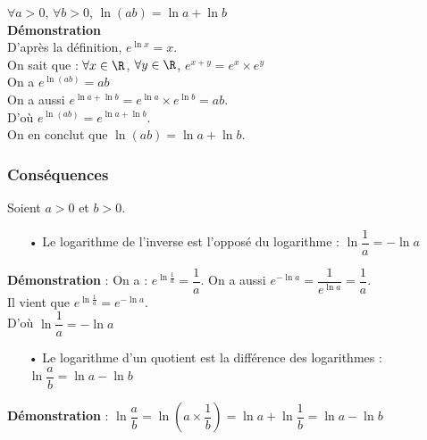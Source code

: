 $\forall a >0$, $\forall b > 0$, $\ln \left(ab\right) = \ln a + \ln b$ \\

\textbf{Démonstration} \\

D'après la définition, $e^{\ln x} = x$. \\

On sait que : $\forall x \in \R$, $\forall y \in \R$, $e^{x+y} = e^x \times e^y$ \\

On a $e^{\ln\left(ab\right)} = ab$ \\

On a aussi $e^{\ln a + \ln b} = e^{\ln a} \times e^{\ln b} = ab$. \\

D'où $e^{\ln\left(ab\right)} = e^{\ln a + \ln b}$. \\

On en conclut que $\ln\left(ab\right) = \ln a + \ln b$. 

\newpage

\subsubsection{Conséquences}

Soient $a>0$ et $b>0$. \\

\begin{itemize}
\item[•] Le logarithme de l'inverse est l'opposé du logarithme : $\ln \dfrac{1}{a} = -\ln a$ \\
\end{itemize}

\textbf{Démonstration} : On a : $e^{\ln \frac{1}{a}} = \dfrac{1}{a}$. On a aussi $e^{-\ln a} = \dfrac{1}{e^{\ln a}} = \dfrac{1}{a}$. \\

Il vient que $e^{\ln \frac{1}{a}} = e^{-\ln a}$. \\

D'où $\ln \dfrac{1}{a} = -\ln a$ \\

\begin{itemize}
\item[•] Le logarithme d'un quotient est la différence des logarithmes : $\ln \dfrac{a}{b} = \ln a - \ln b$ \\
\end{itemize}

\textbf{Démonstration} : $\ln \dfrac{a}{b} = \ln\left(a\times\dfrac{1}{b}\right) = \ln a + \ln \dfrac{1}{b} = \ln a - \ln b$ \\

